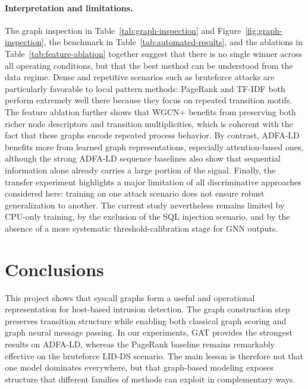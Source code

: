 \documentclass{article}
\begin{document}
\paragraph{Interpretation and limitations.}
The graph inspection in Table~\ref{tab:graph-inspection} and Figure~\ref{fig:graph-inspection}, the benchmark in Table~\ref{tab:automated-results}, and the ablations in Table~\ref{tab:feature-ablation} together suggest that there is no single winner across all operating conditions, but that the best method can be understood from the data regime. Dense and repetitive scenarios such as bruteforce attacks are particularly favorable to local pattern methods: PageRank and TF-IDF both perform extremely well there because they focus on repeated transition motifs. The feature ablation further shows that WGCN+ benefits from preserving both richer node descriptors and transition multiplicities, which is coherent with the fact that these graphs encode repeated process behavior. By contrast, ADFA-LD benefits more from learned graph representations, especially attention-based ones, although the strong ADFA-LD sequence baselines also show that sequential information alone already carries a large portion of the signal. Finally, the transfer experiment highlights a major limitation of all discriminative approaches considered here: training on one attack scenario does not ensure robust generalization to another. The current study nevertheless remains limited by CPU-only training, by the exclusion of the SQL injection scenario, and by the absence of a more systematic threshold-calibration stage for GNN outputs.



\section{Conclusions}
This project shows that syscall graphs form a useful and operational representation for host-based intrusion detection. The graph construction step preserves transition structure while enabling both classical graph scoring and graph neural message passing. In our experiments, GAT provides the strongest results on ADFA-LD, whereas the PageRank baseline remains remarkably effective on the bruteforce LID-DS scenario. The main lesson is therefore not that one model dominates everywhere, but that graph-based modeling exposes structure that different families of methods can exploit in complementary ways.
\end{document}
